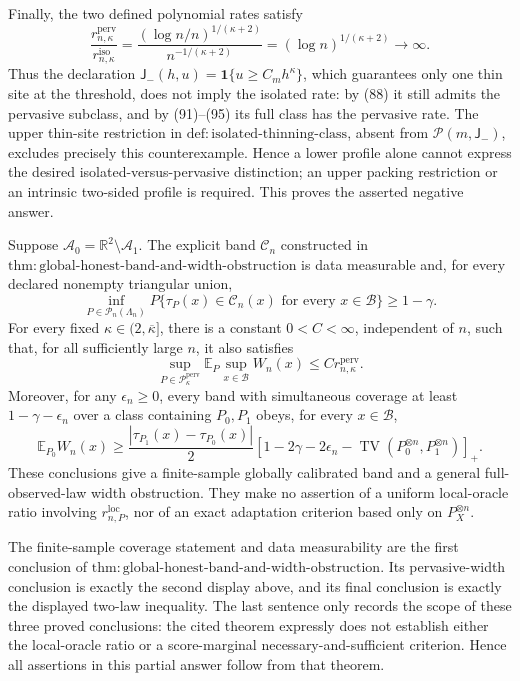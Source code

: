 Finally, the two defined polynomial rates satisfy
\[
 \frac{r_{n,\kappa}^{\mathrm{perv}}}
 {r_{n,\kappa}^{\mathrm{iso}}}
 =\frac{(\log n/n)^{1/(\kappa+2)}}{n^{-1/(\kappa+2)}}
 =(\log n)^{1/(\kappa+2)}\longrightarrow\infty. \tag{96}
\]
Thus the declaration
\(\mathsf J_{-}(h,u)=\mathbf1\{u\ge C_mh^\kappa\}\), which guarantees
only one thin site at the threshold, does not imply the isolated rate:
by (88) it still admits the pervasive subclass, and by (91)--(95) its
full class has the pervasive rate.  The upper thin-site restriction in
\(\mathrm{def:isolated\text{-}thinning\text{-}class}\), absent from
\(\mathcal P(m,\mathsf J_{-})\), excludes precisely this counterexample.
Hence a lower profile alone cannot express the desired
isolated-versus-pervasive distinction; an upper packing restriction or
an intrinsic two-sided profile is required.  This proves the asserted
negative answer.

Suppose \(\mathcal A_0=\mathbb R^2\setminus\mathcal A_1\).  The explicit
band \(\mathcal C_n\) constructed in
\(\mathrm{thm:global\text{-}honest\text{-}band\text{-}and\text{-}width\text{-}obstruction}\)
is data measurable and, for every declared nonempty triangular union,
\[
 \inf_{P\in\mathcal P_n(\Lambda_n)}
 P\{\tau_P(x)\in\mathcal C_n(x)\text{ for every }x\in\mathcal B\}
 \ge1-\gamma.
\]
For every fixed \(\kappa\in(2,\overline\kappa]\), there is a constant
\(0<C<\infty\), independent of \(n\), such that, for all sufficiently
large \(n\), it also satisfies
\[
 \sup_{P\in\mathcal P_{\kappa}^{\mathrm{perv}}}
 \mathbb E_P\sup_{x\in\mathcal B}W_n(x)
 \le C r_{n,\kappa}^{\mathrm{perv}}.
\]
Moreover, for any \(\epsilon_n\ge0\), every band with simultaneous
coverage at least \(1-\gamma-\epsilon_n\) over a class containing
\(P_0,P_1\) obeys, for every \(x\in\mathcal B\),
\[
 \mathbb E_{P_0}W_n(x)\ge
 \frac{|\tau_{P_1}(x)-\tau_{P_0}(x)|}{2}
 \left[1-2\gamma-2\epsilon_n-
 \operatorname{TV}(P_0^{\otimes n},P_1^{\otimes n})\right]_+.
\]
These conclusions give a finite-sample globally calibrated band and a
general full-observed-law width obstruction.  They make no assertion of
a uniform local-oracle ratio involving \(r_{n,P}^{\mathrm{loc}}\), nor of
an exact adaptation criterion based only on \(P_X^{\otimes n}\).

The finite-sample coverage statement and data measurability are the first
conclusion of
\(\mathrm{thm:global\text{-}honest\text{-}band\text{-}and\text{-}width\text{-}obstruction}\).
Its pervasive-width conclusion is exactly the second display above, and
its final conclusion is exactly the displayed two-law inequality.  The
last sentence only records the scope of these three proved conclusions:
the cited theorem expressly does not establish either the local-oracle
ratio or a score-marginal necessary-and-sufficient criterion.  Hence all
assertions in this partial answer follow from that theorem.
